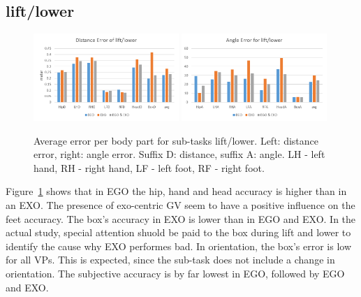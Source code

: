 \subsection{lift/lower}
\begin{figure}[H]
	\centering
	\includegraphics[width=0.49\textwidth]{figures/distanceErrorLiftLower.png}
	\includegraphics[width=0.49\textwidth]{figures/angleErrorLiftLower.png}
	\caption[Average error per body part for sub-tasks lift/lower.]{Average error per body part for sub-tasks lift/lower. Left: distance error, right: angle error. Suffix D: distance, suffix A: angle. LH - left hand, RH - right hand, LF - left foot, RF - right foot.}
	\label{fig:errorLiftLower}
\end{figure}
Figure~\ref{fig:errorLiftLower} shows that in EGO the hip, hand and head accuracy is higher than in an EXO. The presence of exo-centric GV seem to have a positive influence on the feet accuracy. The box's accuracy in EXO is lower than in EGO and EXO. In the actual study, special attention shuold be paid to the box during lift and lower to identify the cause why EXO performes bad. In orientation, the box's error is low for all VPs. This is expected, since the sub-task does not include a change in orientation.
The subjective accuracy is by far lowest in EGO, followed by EGO and EXO.


